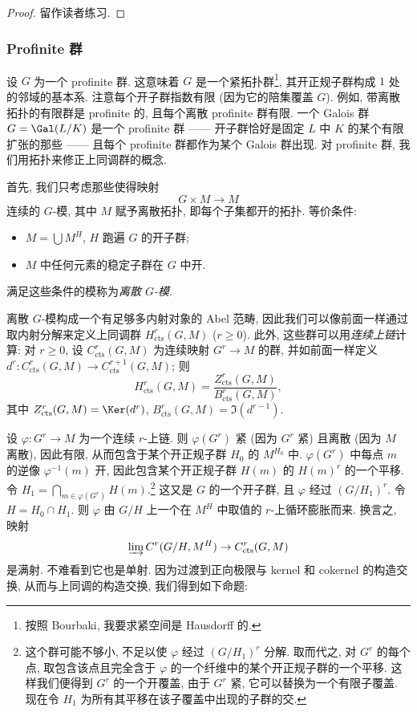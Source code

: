 \begin{proof}
留作读者练习.
\end{proof}

\subsubsection*{Profinite 群}

设 $G$ 为一个 profinite 群. 这意味着 $G$ 是一个紧拓扑群\footnote{按照 Bourbaki, 我要求紧空间是 Hausdorff 的.}, 其开正规子群构成 $1$ 处的邻域的基本系. 注意每个开子群指数有限 (因为它的陪集覆盖 $G$). 例如, 带离散拓扑的有限群是 profinite 的, 且每个离散 profinite 群有限. 一个 Galois 群 $G=\Gal(L/K)$ 是一个 profinite 群 —— 开子群恰好是固定 $L$ 中 $K$ 的某个有限扩张的那些 —— 且每个 profinite 群都作为某个 Galois 群出现. 对 profinite 群, 我们用拓扑来修正上同调群的概念.

首先, 我们只考虑那些使得映射
\[
 G\times M\to M
\]
连续的 $G$-模, 其中 $M$ 赋予离散拓扑, 即每个子集都开的拓扑. 等价条件:
\begin{itemize}
\item $M=\bigcup M^H$, $H$ 跑遍 $G$ 的开子群;
\item $M$ 中任何元素的稳定子群在 $G$ 中开.
\end{itemize}
满足这些条件的模称为\emph{离散 $G$-模}.

离散 $G$-模构成一个有足够多内射对象的 Abel 范畴, 因此我们可以像前面一样通过取内射分解来定义上同调群 $H_{\mathrm{cts}}^r(G,M)$ ($r\ge 0$). 此外, 这些群可以用\emph{连续上链}计算: 对 $r\ge 0$, 设 $C_{\mathrm{cts}}^r(G,M)$ 为连续映射 $G^r\to M$ 的群, 并如前面一样定义 $d^r\colon C_{\mathrm{cts}}^r(G,M)\to C_{\mathrm{cts}}^{r+1}(G,M)$; 则
\[
 H_{\mathrm{cts}}^r(G,M)=\frac{Z_{\mathrm{cts}}^r(G,M)}{B_{\mathrm{cts}}^r(G,M)},
\]
其中 $Z_{\mathrm{cts}}^r(G,M)=\Ker(d^r)$, $B_{\mathrm{cts}}^r(G,M)=\Im(d^{r-1})$.

设 $\varphi\colon G^r\to M$ 为一个连续 $r$-上链. 则 $\varphi(G^r)$ 紧 (因为 $G^r$ 紧) 且离散 (因为 $M$ 离散), 因此有限, 从而包含于某个开正规子群 $H_0$ 的 $M^{H_0}$ 中. $\varphi(G^r)$ 中每点 $m$ 的逆像 $\varphi^{-1}(m)$ 开, 因此包含某个开正规子群 $H(m)$ 的 $H(m)^r$ 的一个平移. 令 $H_1=\bigcap_{m\in\varphi(G^r)}H(m)$.\footnote{这个群可能不够小, 不足以使 $\varphi$ 经过 $(G/H_1)^r$ 分解. 取而代之, 对 $G^r$ 的每个点, 取包含该点且完全含于 $\varphi$ 的一个纤维中的某个开正规子群的一个平移. 这样我们便得到 $G^r$ 的一个开覆盖, 由于 $G^r$ 紧, 它可以替换为一个有限子覆盖. 现在令 $H_1$ 为所有其平移在该子覆盖中出现的子群的交.} 这又是 $G$ 的一个开子群, 且 $\varphi$ 经过 $(G/H_1)^r$. 令 $H=H_0\cap H_1$. 则 $\varphi$ 由 $G/H$ 上一个在 $M^H$ 中取值的 $r$-上循环膨胀而来. 换言之, 映射
\[
 \varinjlim C^r(G/H,M^H)\to C_{\mathrm{cts}}^r(G,M)
\]
是满射. 不难看到它也是单射. 因为过渡到正向极限与 kernel 和 cokernel 的构造交换, 从而与上同调的构造交换, 我们得到如下命题:

